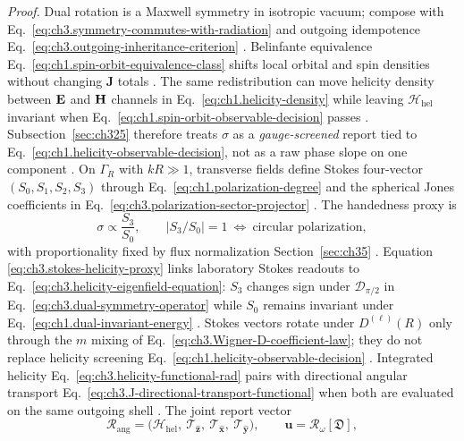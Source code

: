 \noindent\textit{Proof.}
Dual rotation is a Maxwell symmetry in isotropic vacuum; compose with
Eq.~\eqref{eq:ch3.symmetry-commutes-with-radiation} and outgoing idempotence
Eq.~\eqref{eq:ch3.outgoing-inheritance-criterion} \cite{stratton1941}.
Belinfante equivalence Eq.~\eqref{eq:ch1.spin-orbit-equivalence-class} shifts local orbital and spin
densities without changing \(\mathbf{J}\) totals \cite{belinfante1940}. The same redistribution can move
helicity density between \(\mathbf{E}\) and \(\mathbf{H}\) channels in Eq.~\eqref{eq:ch1.helicity-density} while leaving
\(\mathcal{H}_{\mathrm{hel}}\) invariant when Eq.~\eqref{eq:ch1.spin-orbit-observable-decision} passes
\cite{belinfante1940}. Subsection~\ref{sec:ch325} therefore treats \(\sigma\) as a
\emph{gauge-screened} report tied to Eq.~\eqref{eq:ch1.helicity-observable-decision}, not as a raw phase slope
on one component \cite{belinfante1940}.
On \(\Gamma_R\) with \(kR\gg1\), transverse fields define Stokes four-vector
\((S_0,S_1,S_2,S_3)\) through Eq.~\eqref{eq:ch1.polarization-degree} and the spherical Jones coefficients in
Eq.~\eqref{eq:ch3.polarization-sector-projector} \cite{stratton1941}. The handedness proxy is
\begin{equation}
\label{eq:ch3.stokes-helicity-proxy}
\sigma
\propto
\frac{S_3}{S_0},
\qquad
|S_3/S_0|=1
\ \Leftrightarrow\
\text{circular polarization},
\end{equation}
with proportionality fixed by flux normalization Section~\ref{sec:ch35} \cite{stratton1941}. Equation
\eqref{eq:ch3.stokes-helicity-proxy} links laboratory Stokes readouts to
Eq.~\eqref{eq:ch3.helicity-eigenfield-equation}: \(S_3\) changes sign under
\(\mathcal{D}_{\pi/2}\) in Eq.~\eqref{eq:ch3.dual-symmetry-operator} while \(S_0\) remains invariant under
Eq.~\eqref{eq:ch1.dual-invariant-energy} \cite{belinfante1940}. Stokes vectors rotate under
\(D^{(\ell)}(R)\) only through the \(m\) mixing of Eq.~\eqref{eq:ch3.Wigner-D-coefficient-law}; they do not
replace helicity screening Eq.~\eqref{eq:ch1.helicity-observable-decision} \cite{harrington2001}.
Integrated helicity Eq.~\eqref{eq:ch3.helicity-functional-rad} pairs with directional angular transport
Eq.~\eqref{eq:ch3.J-directional-transport-functional} when both are evaluated on the same outgoing shell
\cite{stratton1941}. The joint report vector
\begin{equation}
\label{eq:ch3.helicity-transport-joint-report}
\boldsymbol{\mathcal{R}}_{\mathrm{ang}}
=
\big(\mathcal{H}_{\mathrm{hel}},\ \mathcal{T}_{\hat{\mathbf{z}}},\ \mathcal{T}_{\hat{\mathbf{x}}},\ \mathcal{T}_{\hat{\mathbf{y}}}\big),
\qquad
\mathbf{u}=\mathcal{R}_\omega[\mathfrak{D}],
\end{equation}
